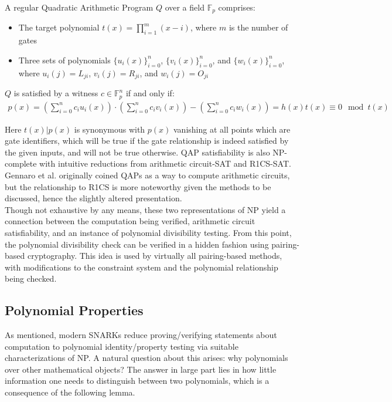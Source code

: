 \begin{definition}
A regular Quadratic Arithmetic Program $Q$ over a field $\mathbb{F}_p$ comprises:
\begin{itemize}
    \item The target polynomial $t(x) = \prod_{i=1}^m (x - i)$, where $m$ is the number of gates
    \item Three sets of polynomials $\{u_i(x)\}_{i=0}^n$, $\{v_i(x)\}_{i=0}^n$, and $\{w_i(x)\}_{i=0}^n$, where $u_i(j) = L_{ji}$, $v_i(j) = R_{ji}$, and $w_i(j) = O_{ji}$
\end{itemize}

$Q$ is satisfied by a witness $c \in \mathbb{F}_p^n$ if and only if:
\begin{align}
p(x) = \left(\sum_{i=0}^n c_i u_i(x)\right) \cdot \left(\sum_{i=0}^n c_i v_i(x)\right) - \left(\sum_{i=0}^n c_i w_i(x)\right) = h(x)t(x) \equiv 0 \mod t(x)
\end{align}
\end{definition}

\noindent Here $t(x) | p(x)$ is synonymous with $p(x)$ vanishing at all points which are gate identifiers, which will be true if the gate relationship is indeed satisfied by the given inputs, and will not be true otherwise. QAP satisfiability is also NP-complete with intuitive reductions from arithmetic circuit-SAT and R1CS-SAT. Gennaro et al. originally coined QAPs as a way to compute arithmetic circuits, but the relationship to R1CS is more noteworthy given the methods to be discussed, hence the slightly altered presentation.\\

\noindent Though not exhaustive by any means, these two representations of NP yield a connection between the computation being verified, arithmetic circuit satisfiability, and an instance of polynomial divisibility testing. From this point, the polynomial divisibility check can be verified in a hidden fashion using pairing-based cryptography. This idea is used by virtually all pairing-based methods, with modifications to the constraint system and the polynomial relationship being checked.

\subsection{Polynomial Properties}
\noindent As mentioned, modern SNARKs reduce proving/verifying statements about computation to polynomial identity/property testing via suitable characterizations of NP. A natural question about this arises: why polynomials over other mathematical objects? The answer in large part lies in how little information one needs to distinguish between two polynomials, which is a consequence of the following lemma.

